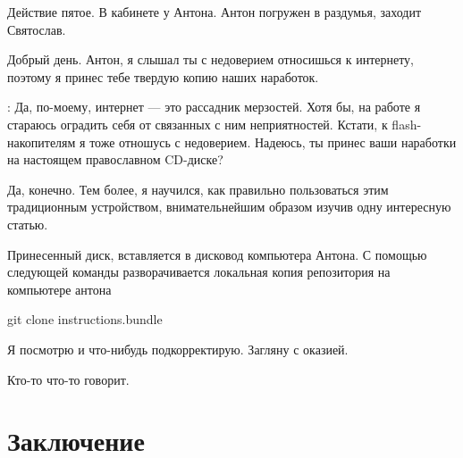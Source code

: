 \documentclass[14pt,a4paper]{article}
\begin{document}
Действие пятое. 
В кабинете у Антона. Антон погружен в раздумья, заходит Святослав.

 Добрый день. Антон, я слышал ты с недоверием относишься к интернету, поэтому я принес
тебе твердую копию наших наработок. 

: Да, по-моему, интернет --- это рассадник мерзостей. 
Хотя бы, на работе я стараюсь оградить себя от связанных с ним неприятностей. 
Кстати, к flash-накопителям я тоже отношусь с недоверием. Надеюсь, ты принес ваши наработки
на настоящем православном CD-диске? 

 Да, конечно. Тем более, я научился, как правильно пользоваться
этим традиционным устройством, внимательнейшим образом изучив одну интересную статью.

Принесенный диск, вставляется в дисковод компьютера Антона. С помощью следующей команды разворачивается
локальная копия репозитория на компьютере антона

git clone instructions.bundle

 Я посмотрю и что-нибудь подкорректирую. Загляну с оказией.

Кто-то что-то говорит.

\section{Заключение}
\end{document}
